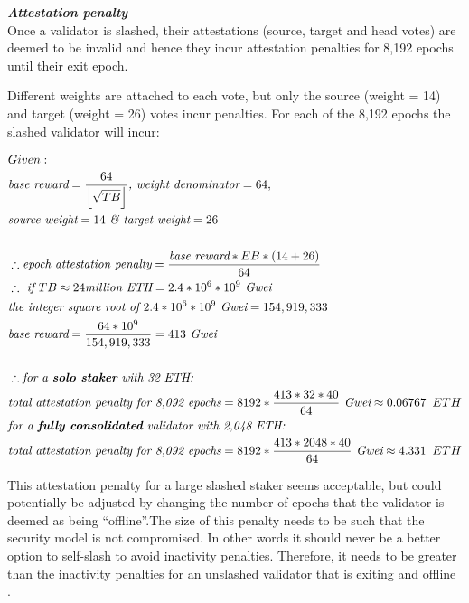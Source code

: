 \noindent
\textbf{\textit{Attestation penalty}} \\
Once a validator is slashed, their attestations (source, target and head votes) are deemed to be invalid and hence they incur attestation penalties for 8,192 epochs until their exit epoch. 

Different weights are attached to each vote, but only the source (weight = 14) and target (weight = 26) votes incur penalties. For each of the 8,192 epochs the slashed validator will incur:

\begin{equation*}
\begin{split}
& Given:\\
& \textit{base reward} = \frac{64}{ \left\lfloor \sqrt{TB} \right\rfloor} \textit{, weight denominator} = 64, \\
& \textit{source weight} = 14 \textit{  \& target weight} = 26\\
& \\
& \therefore \textit{epoch attestation penalty} = \frac{\textit{base reward} * EB * (14 + 26)}{64} \\
& \therefore \textit{ if } TB \approx 24 \textit{million ETH} = 2.4 * 10^6 * 10^9 \textit{ Gwei}\\
& \textit{the integer square root of } 2.4 * 10^6 * 10^9 \textit{ Gwei} = 154,919,333 \\
& \textit{base reward} = \frac{64 * 10^9}{154,919,333} = 413 \textit{ Gwei} \\
& \\
& \therefore \textit{for a \textbf{solo staker} with 32 ETH:} \\
& \textit{total attestation penalty for 8,092 epochs} = 8192 * \frac{413*32*40}{64}  \textit{ Gwei}  \approx 0.06767 \texttt{ } ETH \\
& \textit{for a \textbf{fully consolidated} validator with 2,048 ETH:} \\
& \textit{total attestation penalty for 8,092 epochs} = 8192 * \frac{413*2048*40}{64}  \textit{ Gwei}\approx 4.331 \texttt{ } ETH \\
\end{split}
\end{equation*}

This attestation penalty for a large slashed staker seems acceptable, but could potentially be adjusted by changing the number of epochs that the validator is deemed as being ``offline''.The size of this penalty needs to be such that the security model is not compromised. In other words it should never be a better option to self-slash to avoid inactivity penalties. Therefore, it needs to be greater than the inactivity penalties for an unslashed validator that is exiting and offline \cite{Neuder2023d}. \\

